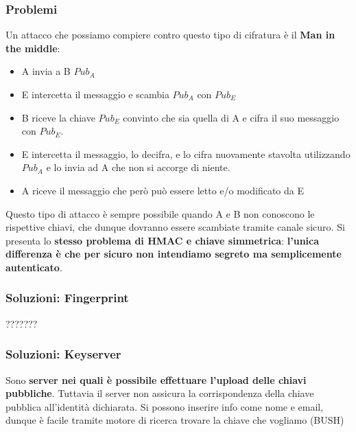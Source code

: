 \documentclass[12pt]{article}
\begin{document}
			\subsubsection{Problemi}
				Un attacco che possiamo compiere contro questo tipo di cifratura è il \textbf{Man in the middle}:
				\begin{itemize}
					\item A invia a B $Pub_{A}$
					\item E intercetta il messaggio e scambia $Pub_{A}$ con $Pub_{E}$
					\item B riceve la chiave $Pub_{E}$ convinto che sia quella di A e cifra il suo messaggio con $Pub_{E}$.
					\item E intercetta il messaggio, lo decifra, e lo cifra nuovamente stavolta utilizzando $Pub_{A}$ e lo invia ad A che non si accorge di niente.
					\item A riceve il messaggio che però può essere letto e/o modificato da E
				\end{itemize}
				Questo tipo di attacco è sempre possibile quando A e B non conoscono le rispettive chiavi, che dunque dovranno essere scambiate tramite canale sicuro. Si presenta lo \textbf{stesso problema di HMAC e chiave simmetrica}: \textbf{l'unica differenza è che per sicuro non intendiamo segreto ma semplicemente autenticato}.
			\subsubsection{Soluzioni: Fingerprint}
			???????
			\subsubsection{Soluzioni: Keyserver}
				Sono \textbf{server nei quali è possibile effettuare l'upload delle chiavi pubbliche}. Tuttavia il server non assicura la corrispondenza della chiave pubblica all'identità dichiarata. Si possono inserire info come nome e email, dunque è facile tramite motore di ricerca trovare la chiave che vogliamo (BUSH)
\end{document}

